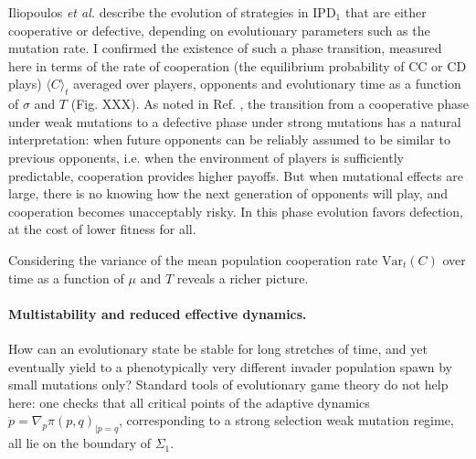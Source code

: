 \documentclass[12pt]{article}
\def\IPD{\textrm{IPD}}
\def\IPD1{\textrm{IPD}_1}
\begin{document}
Iliopoulos \emph{et al.} describe the evolution of strategies in $\IPD1$ that are either cooperative or defective, depending on evolutionary parameters such as the mutation rate. I confirmed the existence of such a phase transition, measured here in terms of the rate of cooperation (the equilibrium probability of CC or CD plays) $\langle C\rangle_t$ averaged over players, opponents and evolutionary time as a function of $\sigma$ and $T$ (Fig. XXX). As noted in Ref. \cite{iliopoulos_critical_2010}, the transition from a cooperative phase under weak mutations to a defective phase under strong mutations has a natural interpretation: when future opponents can be reliably assumed to be similar to previous opponents, i.e. when the environment of players is sufficiently predictable, cooperation provides higher payoffs. But when mutational effects are large, there is no knowing how the next generation of opponents will play, and cooperation becomes unacceptably risky. In this phase evolution favors defection, at the cost of lower fitness for all.

Considering the variance of the mean population cooperation rate $\textrm{Var}_t(C)$ over time as a function of $\mu$ and $T$ reveals a richer picture. 


\paragraph*{Multistability and reduced effective dynamics.}

How can an evolutionary state be stable for long stretches of time, and yet eventually yield to a phenotypically very different invader population spawn by small mutations only? Standard tools of evolutionary game theory do not help here: one checks that all critical points of the adaptive dynamics $\dot{p} = \nabla_p \pi(p, q)_{\vert p = q}$, corresponding to a strong selection weak mutation regime, all lie on the boundary of $\Sigma_1$. 

\end{document}
